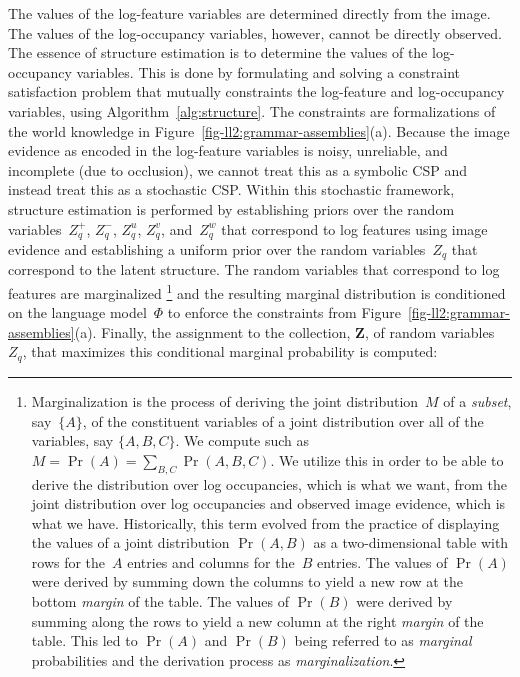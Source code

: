 The values of the log-feature variables are determined directly from the image.
%
The values of the log-occupancy variables, however, cannot be directly observed.
%
The essence of structure estimation is to determine the values of the
log-occupancy variables.
%
This is done by formulating and solving a constraint satisfaction problem that
mutually constraints the log-feature and log-occupancy variables, using
Algorithm~\ref{alg:structure}.
%
The constraints are formalizations of the world knowledge in
Figure~\ref{fig-ll2:grammar-assemblies}(a).
%
Because the image evidence as encoded in the log-feature variables is noisy,
unreliable, and incomplete (due to occlusion), we cannot treat this as a
symbolic CSP and instead treat this as a stochastic CSP.
%
Within this stochastic framework, structure estimation is performed by
establishing priors over the random variables~$Z^+_q$, $Z^-_q$, $Z^u_q$,
$Z^v_q$, and~$Z^w_q$ that correspond to log features using image evidence and
establishing a uniform prior over the random variables~$Z_q$ that correspond to
the latent structure.
%
The random variables that correspond to log features are marginalized
\footnote{Marginalization is the process of deriving the joint distribution~$M$
  of a \emph{subset}, say~$\{A\}$, of the constituent variables of a joint
  distribution over all of the variables, say $\{A,B,C\}$.
  We compute such as $M = \Pr\left(A\right) = \sum_{B,C} \Pr\left(A,B,C\right)$.
  We utilize this in order to be able to derive the distribution over log
  occupancies, which is what we want, from the joint distribution over
  log occupancies and observed image evidence, which is what we have.
  Historically, this term evolved from the practice of displaying the values of
  a joint distribution $\Pr(A,B)$ as a two-dimensional table with rows for
  the~$A$ entries and columns for the~$B$ entries.
  The values of $\Pr(A)$ were derived by summing down the columns to yield a
  new row at the bottom \emph{margin} of the table.
  The values of $\Pr(B)$ were derived by summing along the rows to yield a
  new column at the right \emph{margin} of the table.
  This led to $\Pr(A)$ and $\Pr(B)$ being referred to as \emph{marginal}
  probabilities and the derivation process as \emph{marginalization}.}
and the resulting marginal distribution is conditioned on the language
model~$\Phi$ to enforce the constraints from
Figure~\ref{fig-ll2:grammar-assemblies}(a).
%
Finally, the assignment to the collection, $\mathbf{Z}$, of random
variables~$Z_q$, that maximizes this conditional marginal probability is
computed:

